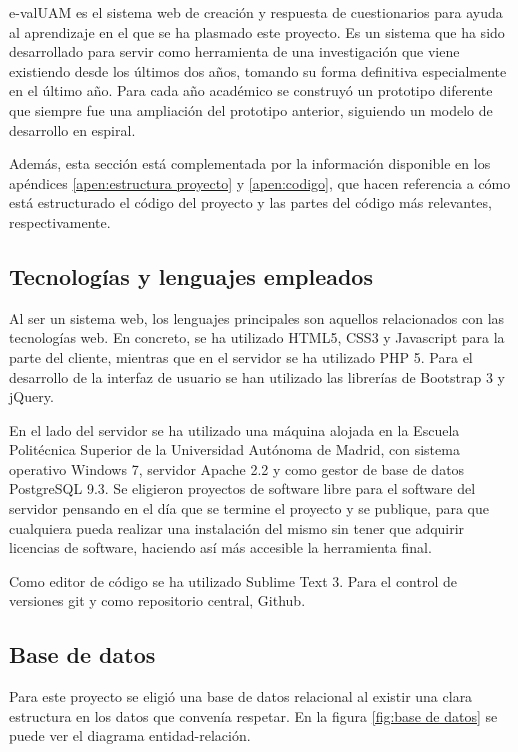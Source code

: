 \acrshort{e-valUAM} es el sistema web de creación y respuesta de cuestionarios para ayuda al aprendizaje en el que se ha plasmado este proyecto. Es un sistema que ha sido desarrollado para servir como herramienta de una investigación que viene existiendo desde los últimos dos años, tomando su forma definitiva especialmente en el último año. Para cada año académico se construyó un prototipo diferente que siempre fue una ampliación del prototipo anterior, siguiendo un modelo de desarrollo en espiral.

Además, esta sección está complementada por la información disponible en los apéndices \ref{apen:estructura proyecto} y \ref{apen:codigo}, que hacen referencia a cómo está estructurado el código del proyecto y las partes del código más relevantes, respectivamente.

\subsection{Tecnologías y lenguajes empleados\label{sec:tecnologias}}

Al ser un sistema web, los lenguajes principales son aquellos relacionados con las tecnologías web. En concreto, se ha utilizado HTML5, CSS3 y Javascript para la parte del cliente, mientras que en el servidor se ha utilizado PHP 5. Para el desarrollo de la interfaz de usuario se han utilizado las librerías de Bootstrap 3 y jQuery.

En el lado del servidor se ha utilizado una máquina alojada en la Escuela Politécnica Superior de la Universidad Autónoma de Madrid, con sistema operativo Windows 7, servidor Apache 2.2 y como gestor de base de datos PostgreSQL 9.3. Se eligieron proyectos de software libre para el software del servidor pensando en el día que se termine el proyecto y se publique, para que cualquiera pueda realizar una instalación del mismo sin tener que adquirir licencias de software, haciendo así más accesible la herramienta final.

Como editor de código se ha utilizado Sublime Text 3. Para el control de versiones git y como repositorio central, Github.


\subsection{Base de datos}

Para este proyecto se eligió una base de datos relacional al existir una clara estructura en los datos que convenía respetar. En la figura \ref{fig:base de datos} se puede ver el diagrama entidad-relación.

